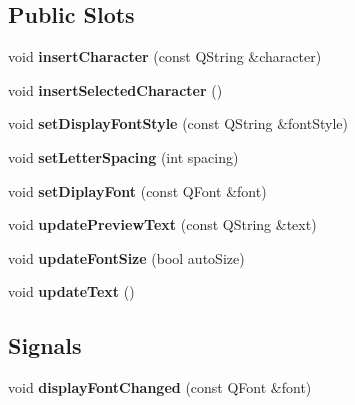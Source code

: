 \subsection*{Public Slots}
\begin{DoxyCompactItemize}
\item 
\hypertarget{class_text_collage_shape_ad404a93a6ac53a522c90f4d563b77690}{
void {\bfseries insertCharacter} (const QString \&character)}
\label{class_text_collage_shape_ad404a93a6ac53a522c90f4d563b77690}

\item 
\hypertarget{class_text_collage_shape_ae8918656666d5f1c8a27153e248bd46b}{
void {\bfseries insertSelectedCharacter} ()}
\label{class_text_collage_shape_ae8918656666d5f1c8a27153e248bd46b}

\item 
\hypertarget{class_text_collage_shape_a622c5497100051b2ef86012e35c45c4d}{
void {\bfseries setDisplayFontStyle} (const QString \&fontStyle)}
\label{class_text_collage_shape_a622c5497100051b2ef86012e35c45c4d}

\item 
\hypertarget{class_text_collage_shape_a50087a612f187a7cb611d3903cb35264}{
void {\bfseries setLetterSpacing} (int spacing)}
\label{class_text_collage_shape_a50087a612f187a7cb611d3903cb35264}

\item 
\hypertarget{class_text_collage_shape_a2da1e1a758d0d022a209ead5ed80ecd5}{
void {\bfseries setDiplayFont} (const QFont \&font)}
\label{class_text_collage_shape_a2da1e1a758d0d022a209ead5ed80ecd5}

\item 
\hypertarget{class_text_collage_shape_a8b8d2c3460980e0cdb972ff07a143f7d}{
void {\bfseries updatePreviewText} (const QString \&text)}
\label{class_text_collage_shape_a8b8d2c3460980e0cdb972ff07a143f7d}

\item 
\hypertarget{class_text_collage_shape_aee9f7ee8b2ce2d2cf44e1e65ca9bf0d5}{
void {\bfseries updateFontSize} (bool autoSize)}
\label{class_text_collage_shape_aee9f7ee8b2ce2d2cf44e1e65ca9bf0d5}

\item 
\hypertarget{class_text_collage_shape_a29b5b18d717f6a2c51c35c402ed3b8d5}{
void {\bfseries updateText} ()}
\label{class_text_collage_shape_a29b5b18d717f6a2c51c35c402ed3b8d5}

\end{DoxyCompactItemize}
\subsection*{Signals}
\begin{DoxyCompactItemize}
\item 
\hypertarget{class_text_collage_shape_a53239487a37b577fbbec0fa16a558d48}{
void {\bfseries displayFontChanged} (const QFont \&font)}
\label{class_text_collage_shape_a53239487a37b577fbbec0fa16a558d48}

\end{DoxyCompactItemize}
